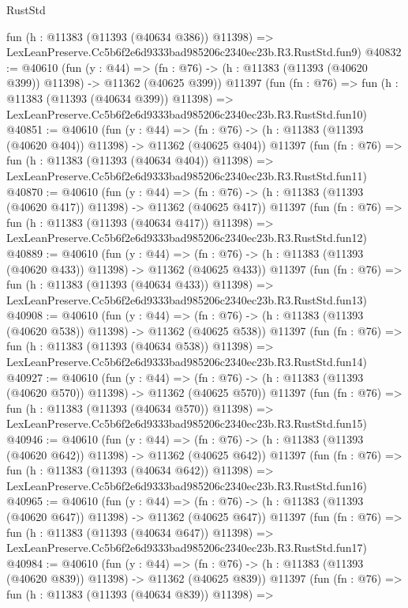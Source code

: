 \begin{lexlean}{RustStd}
\begin{coremodule}
    fun (h : @11383 (@11393 (@40634 @386)) @11398) =>
    LexLeanPreserve.Cc5b6f2e6d9333bad985206c2340ec23b.R3.RustStd.fun9)
@40832 := @40610
    (fun (y : @44) =>
    (fn : @76) -> (h : @11383 (@11393 (@40620 @399)) @11398) -> @11362 (@40625 @399))
    @11397
    (fun (fn : @76) =>
    fun (h : @11383 (@11393 (@40634 @399)) @11398) =>
    LexLeanPreserve.Cc5b6f2e6d9333bad985206c2340ec23b.R3.RustStd.fun10)
@40851 := @40610
    (fun (y : @44) =>
    (fn : @76) -> (h : @11383 (@11393 (@40620 @404)) @11398) -> @11362 (@40625 @404))
    @11397
    (fun (fn : @76) =>
    fun (h : @11383 (@11393 (@40634 @404)) @11398) =>
    LexLeanPreserve.Cc5b6f2e6d9333bad985206c2340ec23b.R3.RustStd.fun11)
@40870 := @40610
    (fun (y : @44) =>
    (fn : @76) -> (h : @11383 (@11393 (@40620 @417)) @11398) -> @11362 (@40625 @417))
    @11397
    (fun (fn : @76) =>
    fun (h : @11383 (@11393 (@40634 @417)) @11398) =>
    LexLeanPreserve.Cc5b6f2e6d9333bad985206c2340ec23b.R3.RustStd.fun12)
@40889 := @40610
    (fun (y : @44) =>
    (fn : @76) -> (h : @11383 (@11393 (@40620 @433)) @11398) -> @11362 (@40625 @433))
    @11397
    (fun (fn : @76) =>
    fun (h : @11383 (@11393 (@40634 @433)) @11398) =>
    LexLeanPreserve.Cc5b6f2e6d9333bad985206c2340ec23b.R3.RustStd.fun13)
@40908 := @40610
    (fun (y : @44) =>
    (fn : @76) -> (h : @11383 (@11393 (@40620 @538)) @11398) -> @11362 (@40625 @538))
    @11397
    (fun (fn : @76) =>
    fun (h : @11383 (@11393 (@40634 @538)) @11398) =>
    LexLeanPreserve.Cc5b6f2e6d9333bad985206c2340ec23b.R3.RustStd.fun14)
@40927 := @40610
    (fun (y : @44) =>
    (fn : @76) -> (h : @11383 (@11393 (@40620 @570)) @11398) -> @11362 (@40625 @570))
    @11397
    (fun (fn : @76) =>
    fun (h : @11383 (@11393 (@40634 @570)) @11398) =>
    LexLeanPreserve.Cc5b6f2e6d9333bad985206c2340ec23b.R3.RustStd.fun15)
@40946 := @40610
    (fun (y : @44) =>
    (fn : @76) -> (h : @11383 (@11393 (@40620 @642)) @11398) -> @11362 (@40625 @642))
    @11397
    (fun (fn : @76) =>
    fun (h : @11383 (@11393 (@40634 @642)) @11398) =>
    LexLeanPreserve.Cc5b6f2e6d9333bad985206c2340ec23b.R3.RustStd.fun16)
@40965 := @40610
    (fun (y : @44) =>
    (fn : @76) -> (h : @11383 (@11393 (@40620 @647)) @11398) -> @11362 (@40625 @647))
    @11397
    (fun (fn : @76) =>
    fun (h : @11383 (@11393 (@40634 @647)) @11398) =>
    LexLeanPreserve.Cc5b6f2e6d9333bad985206c2340ec23b.R3.RustStd.fun17)
@40984 := @40610
    (fun (y : @44) =>
    (fn : @76) -> (h : @11383 (@11393 (@40620 @839)) @11398) -> @11362 (@40625 @839))
    @11397
    (fun (fn : @76) =>
    fun (h : @11383 (@11393 (@40634 @839)) @11398) =>

\end{coremodule}
\end{lexlean}
